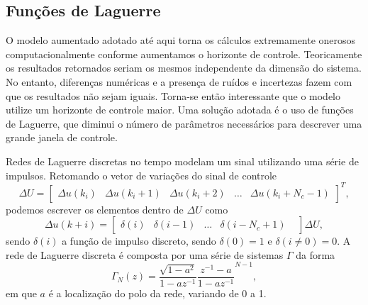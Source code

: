 \subsection{Funções de Laguerre}%
\label{subsec:mpc-laguerre}

O modelo aumentado adotado até aqui torna os cálculos extremamente onerosos
computacionalmente conforme aumentamos o horizonte de controle. Teoricamente os
resultados retornados seriam os mesmos independente da dimensão do sistema. No
entanto, diferenças numéricas e a presença de ruídos e incertezas fazem com que
os resultados não sejam iguais. Torna-se então interessante que o modelo utilize
um horizonte de controle maior. Uma solução adotada é o uso de funções de
Laguerre, que diminui o número de parâmetros necessários para descrever uma
grande janela de controle.

Redes de Laguerre discretas no tempo modelam um sinal utilizando uma série de
impulsos. Retomando o vetor de variações do sinal de controle
%
\begin{equation}
	\Delta{}U = \begin{bmatrix}
		\Delta{}u(k_i)     &
		\Delta{}u(k_i + 1) &
		\Delta{}u(k_i + 2) &
		\hdots{}           &
		\Delta{}u(k_i + N_c - 1)
	\end{bmatrix}^T,
\end{equation}
%
podemos escrever os elementos dentro de \(\Delta{}U\) como
%
\begin{equation}
	\Delta{}u(k+i) = \begin{bmatrix}
		\delta{}(i)           &
		\delta{}(i-1)         &
		\hdots{}              &
		\delta{}(i - N_c + 1) &
	\end{bmatrix}\Delta{}U,
\end{equation}
%
sendo \(\delta{}(i)\) a função de impulso discreto, sendo \(\delta{}(0) = 1\) e
\(\delta{}(i\neq{}0) = 0\). A rede de Laguerre discreta é composta por uma série
de sistemas \(\Gamma{}\) da forma
%
\begin{equation}
	\label{eq:laguerre-system-z}
	\Gamma{}_N(z) = \frac{\sqrt{1-a^2}}{1-az^{-1}}\frac{z^{-1}-a}{1-az^{-1}}^{N-1},
\end{equation}
%
em que \(a\) é a localização do polo da rede, variando de 0 a 1.

